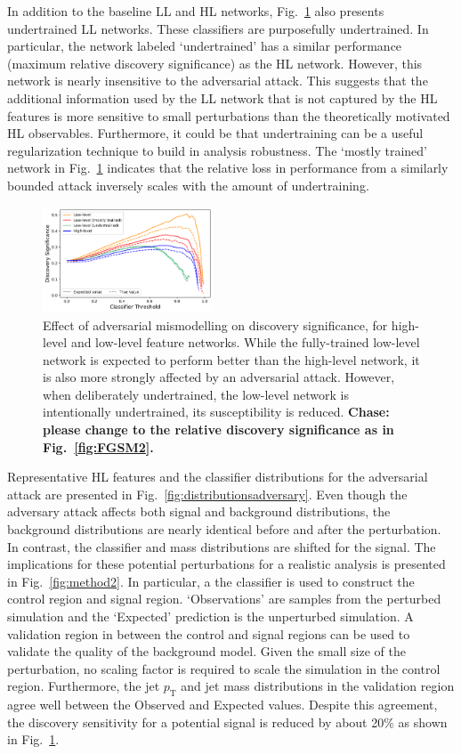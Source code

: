 \documentclass[reprint,nofootinbib,...]{revtex4-1}
\newcommand{\pt}{p_\mathrm{T}} %
\begin{document}
In addition to the baseline LL and HL networks, Fig.~\ref{fig:method2b} also presents undertrained LL networks.   These classifiers are purposefully undertrained.  In particular, the network labeled `undertrained' has a similar performance (maximum relative discovery significance) as the HL network.  However, this network is nearly insensitive to the adversarial attack.  This suggests that the additional information used by the LL network that is not captured by the HL features is more sensitive to small perturbations than the theoretically motivated HL observables.  Furthermore, it could be that undertraining can be a useful regularization technique to build in analysis robustness.  The `mostly trained' network in Fig.~\ref{fig:method2b} indicates that the relative loss in performance from a similarly bounded attack inversely scales with the amount of undertraining. 

\begin{figure}[h!]
\centering
\includegraphics[width=0.45\textwidth]{figures/adversary_significance.pdf}
\caption{Effect of adversarial mismodelling on discovery significance, for high-level and low-level feature networks.
While the fully-trained low-level network is expected to perform better than the high-level network, it is also more strongly affected by an adversarial attack.
However, when deliberately undertrained, the low-level network is intentionally undertrained, its susceptibility is reduced.
\textbf{Chase: please change to the relative discovery significance as in Fig.~\ref{fig:FGSM2}.}}
\label{fig:method2b}
\end{figure}

Representative HL features and the classifier distributions for the adversarial attack are presented in Fig.~\ref{fig:distributionsadversary}.  Even though the adversary attack affects both signal and background distributions, the background distributions are nearly identical before and after the perturbation.  In contrast, the classifier and mass distributions are shifted for the signal.  The implications for these potential perturbations for a realistic analysis is presented in Fig.~\ref{fig:method2}.  In particular, a the classifier is used to construct the control region and signal region.  `Observations' are samples from the perturbed simulation and the `Expected' prediction is the unperturbed simulation.  A validation region in between the control and signal regions can be used to validate the quality of the background model.  Given the small size of the perturbation, no scaling factor is required to scale the simulation in the control region.  Furthermore, the jet $\pt$ and jet mass distributions in the validation region agree well between the Observed and Expected values.  Despite this agreement, the discovery sensitivity for a potential signal is reduced by about 20\% as shown in Fig.~\ref{fig:method2b}.
\end{document}
